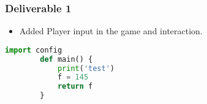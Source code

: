 \documentclass[runningheads]{llncs}
\begin{document}
\subsubsection{Deliverable 1}
\begin{itemize}
    \item Added Player input in the game and interaction.   
\end{itemize}
\begin{mdframed}[backgroundcolor=light-gray,roundcorner=10pt,leftmargin=1, rightmargin=1, innerleftmargin=15, innertopmargin=15,innerbottommargin=15, outerlinewidth=1, linecolor=light-gray]
    \begin{lstlisting}[language=Python]
        import config
        def main() {
            print('test')
            f = 145
            return f
        }
        
    \end{lstlisting}
\end{mdframed}

    
\end{document}
